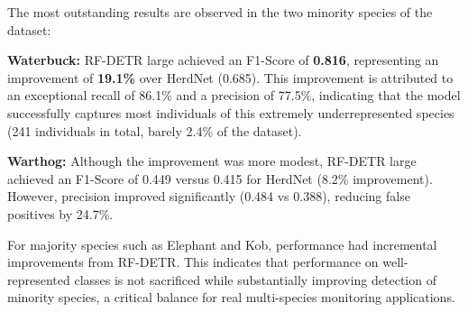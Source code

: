 The most outstanding results are observed in the two minority species of the dataset:

\textbf{Waterbuck:} RF-DETR large achieved an F1-Score of \textbf{0.816}, representing an improvement of \textbf{19.1\%} over HerdNet (0.685). This improvement is attributed to an exceptional recall of 86.1\% and a precision of 77.5\%, indicating that the model successfully captures most individuals of this extremely underrepresented species (241 individuals in total, barely 2.4\% of the dataset).

\textbf{Warthog:} Although the improvement was more modest, RF-DETR large achieved an F1-Score of 0.449 versus 0.415 for HerdNet (8.2\% improvement). However, precision improved significantly (0.484 vs 0.388), reducing false positives by 24.7\%.

For majority species such as Elephant and Kob, performance had incremental improvements from RF-DETR. This indicates that performance on well-represented classes is not sacrificed while substantially improving detection of minority species, a critical balance for real multi-species monitoring applications.

